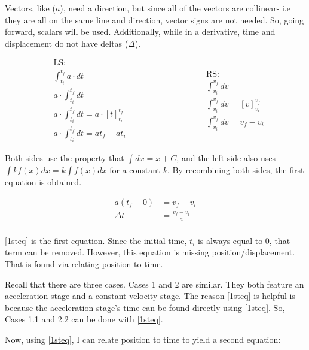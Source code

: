 \documentclass[11pt]{article}
\begin{document}
Vectors, like (${a}$), need a direction, but since all of the vectors are collinear- i.e they are all on the same line and direction, vector signs are not needed. So, going forward, scalars will be used. Additionally, while in a derivative, time and displacement do not have deltas ($\Delta$). 

\begin{equation*}
\begin{aligned}
	&\text{LS:} \\
    &\int_{t_i}^{t_f} a \cdot dt \\
    &a \cdot \int_{t_i}^{t_f} dt \\
    &a \cdot \int_{t_i}^{t_f} dt = a \cdot [t]^{t_f}_{t_i} \\
    &a \cdot \int_{t_i}^{t_f} dt = at_f - at_i
\end{aligned}
\qquad\qquad\qquad\qquad
\begin{aligned}
	&\text{RS:} \\
    &\int_{v_i}^{v_f} dv \\
    &\int_{{v_i}}^{{v_f}} d{v} = [{v}]_{{v_i}}^{{v_f}} \\
    &\int_{{v_i}}^{{v_f}} d{v} = {v_f} - {v_i}
\end{aligned}
\end{equation*} %

 Both sides use the property that $\int dx = x + C$, and the left side also uses $\int kf(x) dx = k \int f(x) dx$ for a constant $k$. By recombining both sides, the first equation is obtained.

\begin{align*}
   a(t_f - 0) &= v_f - v_i \\
   \Delta t &= \frac{v_f - v_i}{a}  \tag{3} \label{1steq} \\
\end{align*}

\eqref{1steq} is the first equation. Since the initial time, $t_i$ is always equal to 0, that term can be removed. However, this equation is missing position/displacement. That is found via relating position to time. 

Recall that there are three cases. Cases 1 and 2 are similar. They both feature an acceleration stage and a constant velocity stage. The reason \eqref{1steq} is helpful is because the acceleration stage's time can be found directly using \eqref{1steq}. So, Cases 1.1 and 2.2 can be done with \eqref{1steq}.

Now, using \eqref{1steq}, I can relate position to time to yield a second equation:
\end{document}

